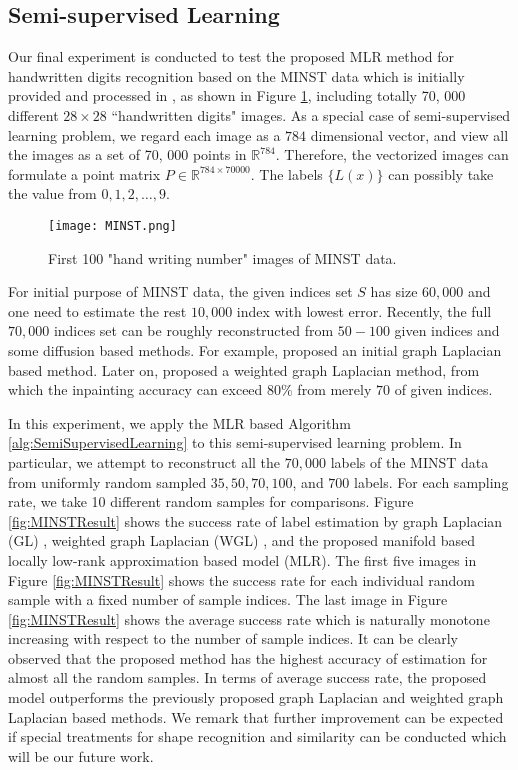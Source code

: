 \documentclass[letterpaper,10pt]{article}
\newcommand{\R}{\mathbb{R}}
\begin{document}
\subsection{Semi-supervised Learning}
Our final experiment is conducted to test the proposed MLR method for handwritten digits recognition based on the MINST data which is initially provided and processed in \cite{lecun1998gradient}, as shown in Figure \ref{fig:MINST}, including totally 70, 000 different $28 \times 28$ ``handwritten digits" images. As a special case of semi-supervised learning problem, we regard each image as a $784$ dimensional vector, and view all the images as a set of 70, 000 points in $\R^{784}$. Therefore, the vectorized images can formulate a point matrix $P \in \R^{784 \times 70000}$. The labels $\{L(x)\}$ can possibly take the value from ${0,1,2,\ldots,9}$.

\begin{figure}[h]
\centering
\texttt{[image: MINST.png]}\\
\caption{First 100 "hand writing number" images of MINST data.}
\label{fig:MINST}
\end{figure}


For initial purpose of MINST data, the given indices set $S$ has size $60,000$ and one need to estimate the rest $10,000$ index with lowest error. Recently, the full $70,000$ indices set can be roughly reconstructed from $50 - 100$ given indices and some diffusion based methods. For example, \cite{zhu2003semi} proposed an initial graph Laplacian based method. Later on, \cite{shi2016weighted} proposed a weighted graph Laplacian method, from which the inpainting accuracy can exceed $80\%$ from merely $70$ of given indices.

In this experiment, we apply the MLR based Algorithm \ref{alg:SemiSupervisedLearning} to this semi-supervised learning problem. In particular, we attempt to reconstruct all the $70,000$ labels of the MINST data \cite{lecun1998gradient} from uniformly random sampled $35, 50, 70, 100$, and $700$ labels. For each sampling rate, we take 10 different random samples for comparisons. Figure \ref{fig:MINSTResult} shows the success rate of label estimation by graph Laplacian (GL) \cite{zhu2003semi}, weighted graph Laplacian (WGL) \cite{shi2016weighted}, and the proposed manifold based locally low-rank approximation based model (MLR). The first five images in Figure \ref{fig:MINSTResult} shows the success rate for each individual random sample with a fixed number of sample indices. The last image in Figure \ref{fig:MINSTResult} shows the average success rate which is naturally monotone increasing with respect to the number of sample indices. It can be clearly observed that the proposed method has the highest accuracy of estimation for almost all the random samples. In terms of average success rate, the proposed model outperforms the previously proposed graph Laplacian and weighted graph Laplacian based methods. We remark that further improvement can be expected if special treatments for shape recognition and similarity can be conducted which will be our future work.
\end{document}

